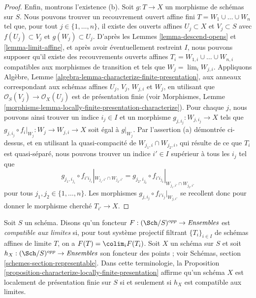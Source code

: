 \begin{proof}
\medskip\noindent
Enfin, montrons l'existence (b). Soit $g : T \to X$ un morphisme de schémas
sur $S$. Nous pouvons trouver un recouvrement ouvert affine fini
$T = W_1 \cup \ldots \cup W_n$ tel que, pour tout
$j \in \{1, \ldots, n\}$, il existe des ouverts affines $U_j \subset X$ et
$V_j \subset S$ avec $f(U_j) \subset V_j$ et $g(W_j) \subset U_j$.
D'après les Lemmes \ref{lemma-descend-opens} et \ref{lemma-limit-affine}, et
après avoir éventuellement restreint $I$, nous pouvons supposer qu'il existe
des recouvrements ouverts affines
$T_i = W_{1, i} \cup \ldots \cup W_{n, i}$ compatibles aux morphismes de
transition et tels que $W_j = \lim_i W_{j, i}$. Appliquons Algèbre,
Lemme \ref{algebra-lemma-characterize-finite-presentation}, aux anneaux
correspondant aux schémas affines $U_j$, $V_j$, $W_{j, i}$ et $W_j$, en
utilisant que $\mathcal{O}_S(V_j) \to \mathcal{O}_X(U_j)$ est de présentation
finie (voir Morphismes,
Lemme \ref{morphisms-lemma-locally-finite-presentation-characterize}). Pour
chaque $j$, nous pouvons ainsi trouver un indice $i_j \in I$ et un morphisme
$g_{j, i_j} : W_{j, i_j} \to X$ tels que
$g_{j, i_j} \circ f_i|_{W_j} : W_j \to W_{j, i} \to X$ soit égal à
$g|_{W_j}$. Par l'assertion (a) démontrée ci-dessus, et en utilisant la
quasi-compacité de $W_{j_1, i} \cap W_{j_2, i}$, qui résulte de ce que $T_i$
est quasi-séparé, nous pouvons trouver un indice $i' \in I$ supérieur à tous
les $i_j$ tel que
$$
g_{j_1, i_{j_1}} \circ f_{i'i_{j_1}}|_{W_{j_1, i'} \cap W_{j_2, i'}} =
g_{j_2, i_{j_2}} \circ f_{i'i_{j_2}}|_{W_{j_1, i'} \cap W_{j_2, i'}}
$$
pour tous $j_1, j_2 \in \{1, \ldots, n\}$. Les morphismes
$g_{j, i_j} \circ f_{i'i_j}|_{W_{j, i'}}$ se recollent donc pour donner le
morphisme cherché $T_{i'} \to X$.
\end{proof}

\begin{remark}
\label{remark-limit-preserving}
Soit $S$ un schéma. Disons qu'un foncteur
$F : (\Sch/S)^{opp} \to \textit{Ensembles}$ est
{\it compatible aux limites} si, pour tout système projectif filtrant
$\{T_i\}_{i \in I}$ de schémas affines de limite $T$, on a
$F(T) = \colim_i F(T_i)$. Soit $X$ un schéma sur $S$ et soit
$h_X : (\Sch/S)^{opp} \to \textit{Ensembles}$ son foncteur des points ; voir
Schémas, section \ref{schemes-section-representable}. Dans cette
terminologie, la
Proposition \ref{proposition-characterize-locally-finite-presentation}
affirme qu'un schéma $X$ est localement de présentation finie sur $S$ si et
seulement si $h_X$ est compatible aux limites.
\end{remark}

